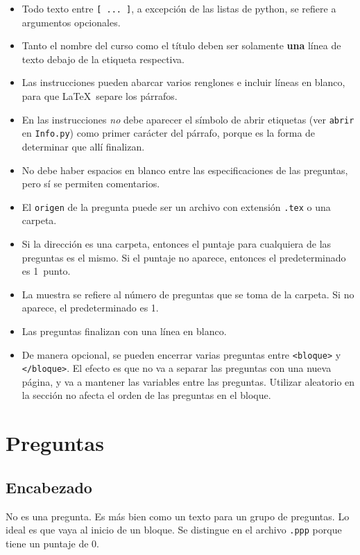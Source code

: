 \documentclass[12pt]{article}
\theoremstyle{definition}
\begin{document}
\begin{itemize}
  \item Todo texto entre \verb|[ ... ]|, a excepción de las listas de python, se refiere a argumentos opcionales.
  \item Tanto el nombre del curso como el título deben ser solamente \textbf{una} línea de texto debajo de la etiqueta respectiva.
  \item Las instrucciones pueden abarcar varios renglones e incluir líneas en blanco, para que \LaTeX\ separe los párrafos. 
  \item En las instrucciones \emph{no} debe aparecer el símbolo de abrir etiquetas (ver \verb|abrir| en \verb|Info.py|) como primer carácter del párrafo, porque es la forma de determinar que allí finalizan.
  \item No debe haber espacios en blanco entre las especificaciones de las preguntas, pero sí se permiten comentarios.
  \item El \verb|origen| de la pregunta puede ser un archivo con extensión \verb|.tex| o una carpeta.
  \item Si la dirección es una carpeta, entonces el puntaje para cualquiera de las preguntas es el mismo. Si el puntaje no aparece, entonces el predeterminado es 1~punto.
  \item La muestra se refiere al número de preguntas que se toma de la carpeta. Si no aparece, el predeterminado es 1.
  \item Las preguntas finalizan con una línea en blanco.
  \item De manera opcional, se pueden encerrar varias preguntas entre \verb|<bloque>| y \verb|</bloque>|. El efecto es que no va a separar las preguntas con una nueva página, y va a mantener las variables entre las preguntas. Utilizar aleatorio en la sección no afecta el orden de las preguntas en el bloque.
\end{itemize}

\section{Preguntas}

\subsection{Encabezado}
No es una pregunta. Es más bien como un texto para un grupo de preguntas. Lo ideal es que vaya al inicio de un bloque. Se distingue en el archivo \verb|.ppp| porque tiene un puntaje de 0.
\end{document}

